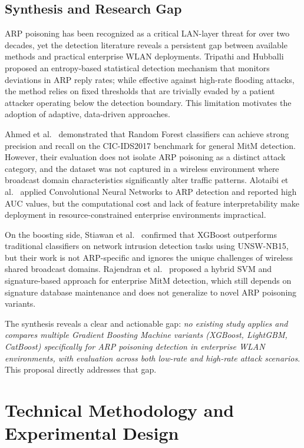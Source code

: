 \documentclass[12pt,a4paper]{article}
\begin{document}
\subsection{Synthesis and Research Gap}

ARP poisoning has been recognized as a critical LAN-layer threat for over two
decades, yet the detection literature reveals a persistent gap between available
methods and practical enterprise WLAN deployments. Tripathi and Hubballi
\cite{tripathi2022} proposed an entropy-based statistical detection mechanism
that monitors deviations in ARP reply rates; while effective against high-rate
flooding attacks, the method relies on fixed thresholds that are trivially evaded
by a patient attacker operating below the detection boundary. This limitation
motivates the adoption of adaptive, data-driven approaches.

Ahmed et al.\ \cite{ahmed2023} demonstrated that Random Forest classifiers can
achieve strong precision and recall on the CIC-IDS2017 benchmark for general
MitM detection. However, their evaluation does not isolate ARP poisoning as a
distinct attack category, and the dataset was not captured in a wireless
environment where broadcast domain characteristics significantly alter traffic
patterns. Alotaibi et al.\ \cite{alotaibi2023} applied Convolutional Neural
Networks to ARP detection and reported high AUC values, but the computational
cost and lack of feature interpretability make deployment in resource-constrained
enterprise environments impractical.

On the boosting side, Stiawan et al.\ \cite{stiawan2024} confirmed that XGBoost
outperforms traditional classifiers on network intrusion detection tasks using
UNSW-NB15, but their work is not ARP-specific and ignores the unique challenges
of wireless shared broadcast domains. Rajendran et al.\ \cite{rajendran2022}
proposed a hybrid SVM and signature-based approach for enterprise MitM detection,
which still depends on signature database maintenance and does not generalize to
novel ARP poisoning variants.

The synthesis reveals a clear and actionable gap: \textit{no existing study
applies and compares multiple Gradient Boosting Machine variants (XGBoost,
LightGBM, CatBoost) specifically for ARP poisoning detection in enterprise
WLAN environments, with evaluation across both low-rate and high-rate attack
scenarios}. This proposal directly addresses that gap.

\section{Technical Methodology and Experimental Design}
\end{document}
